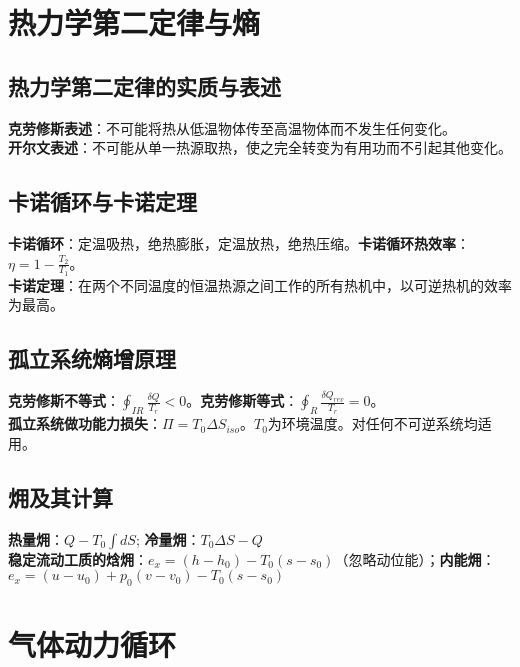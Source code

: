\documentclass[a4paper,9pt]{ctexart}
\begin{document}
\section{热力学第二定律与熵}
\subsection{热力学第二定律的实质与表述}
\noindent
\textbf{克劳修斯表述}：不可能将热从低温物体传至高温物体而不发生任何变化。\\
\textbf{开尔文表述}：不可能从单一热源取热，使之完全转变为有用功而不引起其他变化。

\subsection{卡诺循环与卡诺定理}
\noindent
\textbf{卡诺循环}：定温吸热，绝热膨胀，定温放热，绝热压缩。\textbf{卡诺循环热效率}：$\eta=1-\frac{T_2}{T_1}$。\\
\textbf{卡诺定理}：在两个不同温度的恒温热源之间工作的所有热机中，以可逆热机的效率为最高。

\subsection{孤立系统熵增原理}
\noindent
\textbf{克劳修斯不等式}：$\oint_{IR}\frac{\delta Q}{T_r}<0$。\textbf{克劳修斯等式}：$\oint_R\frac{\delta Q_{rev}}{T_r}=0$。\\
\textbf{孤立系统做功能力损失}：$\Pi=T_0\Delta S_{iso}$。$T_0$为环境温度。对任何不可逆系统均适用。

\subsection{㶲及其计算}
\noindent
\textbf{热量㶲}：$Q-T_0\int dS$; \textbf{冷量㶲}：$T_0\Delta S-Q$\\
\textbf{稳定流动工质的焓㶲}：$e_x=(h-h_0)-T_0(s-s_0)$（忽略动位能）；\textbf{内能㶲}：$e_x=(u-u_0)+p_0(v-v_0)-T_0(s-s_0)$



\section{气体动力循环}
\end{document}
